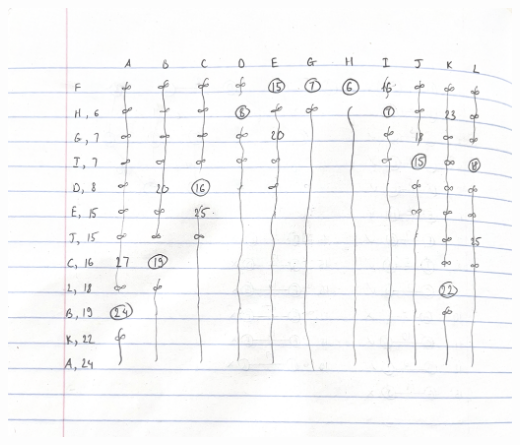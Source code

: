 \documentclass{article}
\begin{document}
\begin{itemize}
        \includegraphics[scale=0.5]{HW6_Q3.png}

\end{itemize}
\end{document}
